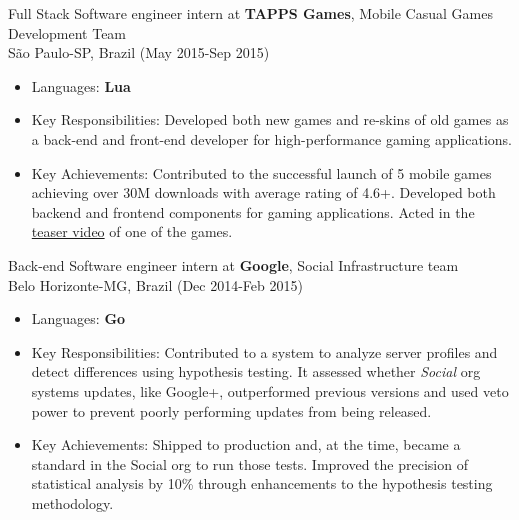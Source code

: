 
\normalsize{Full Stack Software engineer intern at \textbf{TAPPS Games}, Mobile Casual Games Development Team}\\
        \scriptsize{São Paulo-SP, Brazil (May 2015-Sep 2015)}
\begin{itemize}
    \item \footnotesize{Languages:}\scriptsize{ \textbf{Lua}}
    \item \footnotesize{Key Responsibilities:}\scriptsize{ Developed both new games and re-skins of old games as a back-end and front-end developer for high-performance gaming applications.}
    \item \footnotesize{Key Achievements:}\scriptsize{ Contributed to the successful launch of 5 mobile games achieving over 30M downloads with average rating of 4.6+. Developed both backend and frontend components for gaming applications. Acted in the \href{https://www.youtube.com/watch?v=ttjWkk9w-8Q}{teaser video} of one of the games.}
\end{itemize}


\normalsize{Back-end Software engineer intern at \textbf{Google}, Social Infrastructure team}\\
        \scriptsize{Belo Horizonte-MG, Brazil (Dec 2014-Feb 2015)}
\begin{itemize}
    \item \footnotesize{Languages:}\scriptsize{ \textbf{Go}}
    \item \footnotesize{Key Responsibilities:}\scriptsize{ Contributed to a system to analyze server profiles and detect differences using hypothesis testing. It assessed whether \textit{Social} org systems updates, like Google+, outperformed previous versions and used veto power to prevent poorly performing updates from being released.}
    \item \footnotesize{Key Achievements:}\scriptsize{ Shipped to production and, at the time, became a standard in the Social org to run those tests. Improved the precision of statistical analysis by 10\% through enhancements to the hypothesis testing methodology.}
\end{itemize}


